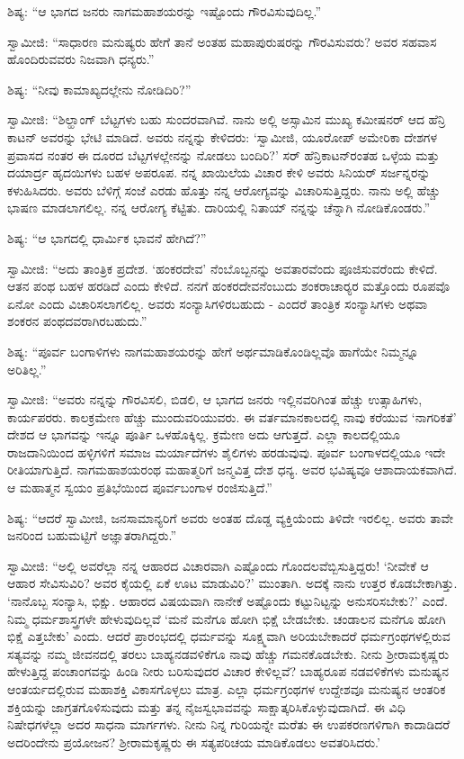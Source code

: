  ಶಿಷ್ಯ: “ಆ ಭಾಗದ ಜನರು ನಾಗಮಹಾಶಯರನ್ನು ಇಷ್ಟೊಂದು ಗೌರವಿಸುವುದಿಲ್ಲ.” 

 ಸ್ವಾಮೀಜಿ: “ಸಾಧಾರಣ ಮನುಷ್ಯರು ಹೇಗೆ ತಾನೆ ಅಂತಹ ಮಹಾಪುರುಷರನ್ನು ಗೌರವಿಸುವರು? ಅವರ ಸಹವಾಸ ಹೊಂದಿರುವವರು ನಿಜವಾಗಿ ಧನ್ಯರು.” 

 ಶಿಷ್ಯ: “ನೀವು ಕಾಮಾಖ್ಯದಲ್ಲೇನು ನೋಡಿದಿರಿ?” 

 ಸ್ವಾಮೀಜಿ: “ಶಿಲ್ಹಾಂಗ್ ಬೆಟ್ಟಗಳು ಬಹು ಸುಂದರವಾಗಿವೆ. ನಾನು ಅಲ್ಲಿ ಅಸ್ಸಾಮಿನ ಮುಖ್ಯ ಕಮೀಷನರ್ ಆದ ಹೆನ್ರಿ ಕಾಟನ್ ಅವರನ್ನು ಭೇಟಿ ಮಾಡಿದೆ. ಅವರು ನನ್ನನ್ನು ಕೇಳಿದರು: ‘ಸ್ವಾಮೀಜಿ, ಯೂರೋಪ್ ಅಮೇರಿಕಾ ದೇಶಗಳ ಪ್ರವಾಸದ ನಂತರ ಈ ದೂರದ ಬೆಟ್ಟಗಳಲ್ಲೇನನ್ನು ನೋಡಲು ಬಂದಿರಿ?’ ಸರ್ ಹೆನ್ರಿಕಾಟನ್‍ರಂತಹ ಒಳ್ಳೆಯ ಮತ್ತು ದಯಾರ್ದ್ರ ಹೃದಯಿಗಳು ಬಹಳ ಅಪರೂಪ. ನನ್ನ ಖಾಯಿಲೆಯ ವಿಚಾರ ಕೇಳಿ ಅವರು ಸಿನಿಯರ್ ಸರ್ಜನ್ನರನ್ನು ಕಳುಹಿಸಿದರು. ಅವರು ಬೆಳಿಗ್ಗೆ ಸಂಜೆ ಎರಡು ಹೊತ್ತು ನನ್ನ ಆರೋಗ್ಯವನ್ನು ವಿಚಾರಿಸುತ್ತಿದ್ದರು. ನಾನು ಅಲ್ಲಿ ಹೆಚ್ಚು ಭಾಷಣ ಮಾಡಲಾಗಲಿಲ್ಲ. ನನ್ನ ಆರೋಗ್ಯ ಕೆಟ್ಟಿತು. ದಾರಿಯಲ್ಲಿ ನಿತಾಯ್ ನನ್ನನ್ನು ಚೆನ್ನಾಗಿ ನೋಡಿಕೊಂಡರು.” 

 ಶಿಷ್ಯ: “ಆ ಭಾಗದಲ್ಲಿ ಧಾರ್ಮಿಕ ಭಾವನೆ ಹೇಗಿದೆ?” 

 ಸ್ವಾಮೀಜಿ: “ಅದು ತಾಂತ್ರಿಕ ಪ್ರದೇಶ. ‘ಹಂಕರದೇವ’ ನೆಂಬೊಬ್ಬನನ್ನು ಅವತಾರವೆಂದು ಪೂಜಿಸುವರೆಂದು ಕೇಳಿದೆ. ಆತನ ಪಂಥ ಬಹಳ ಹರಡಿದೆ ಎಂದು ಕೇಳಿದೆ. ನನಗೆ ಹಂಕರದೇವನೆಂಬುದು ಶಂಕರಾಚಾರ‍್ಯರ ಮತ್ತೊಂದು ರೂಪವೊ ಏನೋ ಎಂದು ವಿಚಾರಿಸಲಾಗಲಿಲ್ಲ. ಅವರು ಸಂನ್ಯಾಸಿಗಳಿರಬಹುದು - ಎಂದರೆ ತಾಂತ್ರಿಕ ಸಂನ್ಯಾಸಿಗಳು ಅಥವಾ ಶಂಕರನ ಪಂಥದವರಾಗಿರಬಹುದು.” 

 ಶಿಷ್ಯ: “ಪೂರ್ವ ಬಂಗಾಳಿಗಳು ನಾಗಮಹಾಶಯರನ್ನು ಹೇಗೆ ಅರ್ಥಮಾಡಿಕೊಂಡಿಲ್ಲವೊ ಹಾಗೆಯೇ ನಿಮ್ಮನ್ನೂ ಅರಿತಿಲ್ಲ.” 

 ಸ್ವಾಮೀಜಿ: “ಅವರು ನನ್ನನ್ನು ಗೌರವಿಸಲಿ, ಬಿಡಲಿ, ಆ ಭಾಗದ ಜನರು ಇಲ್ಲಿನವರಿಗಿಂತ ಹೆಚ್ಚು ಉತ್ಸಾಹಿಗಳು, ಕಾರ್ಯಪರರು. ಕಾಲಕ್ರಮೇಣ ಹೆಚ್ಚು ಮುಂದುವರಿಯುವರು. ಈ ವರ್ತಮಾನಕಾಲದಲ್ಲಿ ನಾವು ಕರೆಯುವ ‘ನಾಗರಿಕತೆ’ ದೇಶದ ಆ ಭಾಗವನ್ನು ಇನ್ನೂ ಪೂರ್ತಿ ಒಳಹೊಕ್ಕಿಲ್ಲ. ಕ್ರಮೇಣ ಅದು ಆಗುತ್ತದೆ. ಎಲ್ಲಾ ಕಾಲದಲ್ಲಿಯೂ ರಾಜದಾನಿಯಿಂದ ಹಳ್ಳಿಗಳಿಗೆ ಸಮಾಜ ಮರ್ಯಾದೆಗಳು ಶೈಲಿಗಳು ಹರಡುವುವು. ಪೂರ್ವ ಬಂಗಾಳದಲ್ಲಿಯೂ ಇದೇ ರೀತಿಯಾಗುತ್ತಿದೆ. ನಾಗಮಹಾಶಯರಂಥ ಮಹಾತ್ಮರಿಗೆ ಜನ್ಮವಿತ್ತ ದೇಶ ಧನ್ಯ. ಅವರ ಭವಿಷ್ಯವೂ ಆಶಾದಾಯಕವಾಗಿದೆ. ಆ ಮಹಾತ್ಮನ ಸ್ವಯಂ ಪ್ರತಿಭೆಯಿಂದ ಪೂರ್ವಬಂಗಾಳ ರಂಜಿಸುತ್ತಿದೆ.” 

 ಶಿಷ್ಯ: “ಆದರೆ ಸ್ವಾಮೀಜಿ, ಜನಸಾಮಾನ್ಯರಿಗೆ ಅವರು ಅಂತಹ ದೊಡ್ಡ ವ್ಯಕ್ತಿಯೆಂದು ತಿಳಿದೇ ಇರಲಿಲ್ಲ. ಅವರು ತಾವೇ ಜನರಿಂದ ಬಹುಮಟ್ಟಿಗೆ ಅಜ್ಞಾತರಾಗಿದ್ದರು.” 

 ಸ್ವಾಮೀಜಿ: “ಅಲ್ಲಿ ಅವರೆಲ್ಲಾ ನನ್ನ ಆಹಾರದ ವಿಚಾರವಾಗಿ ಎಷ್ಟೊಂದು ಗೊಂದಲವೆಬ್ಬಿಸುತ್ತಿದ್ದರು! ‘ನೀವೇಕೆ ಆ ಆಹಾರ ಸೇವಿಸುವಿರಿ? ಅವರ ಕೈಯಲ್ಲಿ ಏಕೆ ಊಟ ಮಾಡುವಿರಿ?’ ಮುಂತಾಗಿ. ಅದಕ್ಕೆ ನಾನು ಉತ್ತರ ಕೊಡಬೇಕಾಗಿತ್ತು. ‘ನಾನೊಬ್ಬ ಸಂನ್ಯಾಸಿ, ಭಿಕ್ಷು. ಆಹಾರದ ವಿಷಯವಾಗಿ ನಾನೇಕೆ ಅಷ್ಟೊಂದು ಕಟ್ಟುನಿಟ್ಟನ್ನು ಅನುಸರಿಸಬೇಕು?’ ಎಂದೆ. ನಿಮ್ಮ ಧರ್ಮಶಾಸ್ತ್ರಗಳೇ ಹೇಳುವುದಿಲ್ಲವೆ ‘ಮನೆ ಮನೆಗೂ ಹೋಗಿ ಭಿಕ್ಷೆ ಬೇಡಬೇಕು. ಚಂಡಾಲನ ಮನೆಗೂ ಹೋಗಿ ಭಿಕ್ಷೆ ಎತ್ತಬೇಕು’ ಎಂದು. ಆದರೆ ಪ್ರಾರಂಭದಲ್ಲಿ ಧರ್ಮವನ್ನು ಸೂಕ್ಷ್ಮವಾಗಿ ಅರಿಯಬೇಕಾದರೆ ಧರ್ಮಗ್ರಂಥಗಳಲ್ಲಿರುವ ಸತ್ಯವನ್ನು ನಮ್ಮ ಜೀವನದಲ್ಲಿ ತರಲು ಬಾಹ್ಯನಡವಳಿಕೆಗೂ ನಾವು ಹೆಚ್ಚು ಗಮನಕೊಡಬೇಕು. ನೀನು ಶ‍್ರೀರಾಮಕೃಷ್ಣರು ಹೇಳುತ್ತಿದ್ದ ಪಂಚಾಂಗವನ್ನು ಹಿಂಡಿ ನೀರು ಬರಿಸುವುದರ ವಿಚಾರ ಕೇಳಿಲ್ಲವೆ? ಬಾಹ್ಯರೂಪ ನಡವಳಿಕೆಗಳು ಮನುಷ್ಯನ ಆಂತರ್ಯದಲ್ಲಿರುವ ಮಹಾಶಕ್ತಿ ವಿಕಾಸಗೊಳ್ಳಲು ಮಾತ್ರ. ಎಲ್ಲಾ ಧರ್ಮಗ್ರಂಥಗಳ ಉದ್ದೇಶವೂ‌ ಮನುಷ್ಯನ ಆಂತರಿಕ ಶಕ್ತಿಯನ್ನು ಜಾಗ್ರತಗೊಳಿಸುವುದು ಮತ್ತು ತನ್ನ ನೈಜಸ್ವಭಾವವನ್ನು ಸಾಕ್ಷಾತ್ಕರಿಸಿಕೊಳ್ಳುವುದಾಗಿದೆ. ಈ ವಿಧಿ ನಿಷೇಧಗಳೆಲ್ಲಾ ಅದರ ಸಾಧನಾ ಮಾರ್ಗಗಳು. ನೀನು ನಿನ್ನ ಗುರಿಯನ್ನೇ ಮರೆತು ಈ ಉಪಕರಣಗಳಿಗಾಗಿ ಕಾದಾಡಿದರೆ ಅದರಿಂದೇನು ಪ್ರಯೋಜನ? ಶ‍್ರೀರಾಮಕೃಷ್ಣರು ಈ ಸತ್ಯಪರಿಚಯ ಮಾಡಿಕೊಡಲು ಅವತರಿಸಿದರು.’ 

